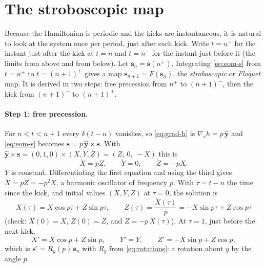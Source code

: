 \documentclass[11pt,a4paper]{article}
\newcommand{\vs}{\bm{s}}
\begin{document}
\section{The stroboscopic map}\label{sec:map}

Because the Hamiltonian is periodic and the kicks are instantaneous, it is natural to look at the system once per
period, just after each kick. Write $t = n^+$ for the instant just after the kick at $t = n$ and $t = n^-$ for the
instant just before it (the limits from above and from below). Let $\vs_n = \vs(n^+)$. Integrating
\eqref{eq:eom-s} from $t=n^+$ to $t=(n+1)^+$ gives a map $\vs_{n+1} = F(\vs_n)$, the \emph{stroboscopic} or
\emph{Floquet} map. It is derived in two steps: free precession from $n^+$ to $(n+1)^-$, then the kick from
$(n+1)^-$ to $(n+1)^+$.

\paragraph{Step 1: free precession.} For $n < t < n+1$ every $\delta(t-n)$ vanishes, so \eqref{eq:grad-h} is
$\nabla_{\!s} h = p\,\hat{\bm y}$ and \eqref{eq:eom-s} becomes $\dot{\vs} = p\,\hat{\bm y}\times\vs$. With
$\hat{\bm y}\times\vs = (0,1,0)\times(X,Y,Z) = (Z,\ 0,\ -X)$ this is
\begin{equation*}
  \dot X = pZ, \qquad \dot Y = 0, \qquad \dot Z = -pX .
\end{equation*}
$Y$ is constant. Differentiating the first equation and using the third gives $\ddot X = p\dot Z = -p^2X$, a harmonic
oscillator of frequency $p$. With $\tau = t - n$ the time since the kick, and initial values $(X,Y,Z)$ at $\tau=0$,
the solution is
\begin{equation*}
  X(\tau) = X\cos p\tau + Z\sin p\tau, \qquad Z(\tau) = \frac{\dot X(\tau)}{p} = -X\sin p\tau + Z\cos p\tau
\end{equation*}
(check: $X(0) = X$, $Z(0) = Z$, and $\dot Z = -p\,X(\tau)$). At $\tau = 1$, just before the next kick,
\begin{equation}\label{eq:rotation-y}
  X' = X\cos p + Z\sin p, \qquad Y' = Y, \qquad Z' = -X\sin p + Z\cos p ,
\end{equation}
which is $\vs' = R_y(p)\,\vs_n$ with $R_y$ from \eqref{eq:rotations}: a rotation about $y$ by the angle $p$.
\end{document}
